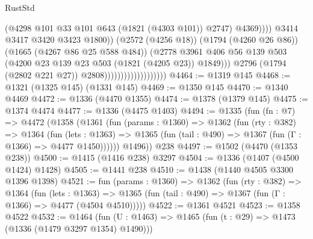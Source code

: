 \begin{lexlean}{RustStd}
\begin{coremodule}
{\begin{coremodule}
{{{{{{{{{{{{{{                                                        (@4298
                                                          @101
                                                          @33
                                                          @101
                                                          @643
                                                          (@1821 (@4303 @101))
                                                          @2747)
                                                        @4369))))
                                                @3414
                                                @3417
                                                @3420
                                                @3423
                                                @1800))
                                            (@2572 (@4256 @18))
                                            (@1794 (@4260 @26 @86))
                                            (@1665 (@4267 @86 @25 @588 @484))
                                            (@2778
                                              @3961
                                              @406
                                              @56
                                              @139
                                              @503
                                              (@4200 @23 @139 @23 @503 (@1821 (@4205 @23)) @1849)))
                                          @2796
                                          (@1794 (@2802 @221 @27))
                                          @2808)))))))))))))))))))
@4464 := @1319 @145
@4468 := @1321 (@1325 @145) (@1331 @145)
@4469 := @1350 @145
@4470 := @1340 @4469
@4472 := @1336 (@4470 @1355)
@4474 := @1378 (@1379 @145)
@4475 := @1374 @4474
@4477 := @1336 (@4475 @1403)
@4494 := @1335
    (fun (fn : @7) =>
    @4472
      (@1358
        (@1361
          (fun (params : @1360) =>
          @1362
            (fun (rty : @382) =>
            @1364
              (fun (lets : @1363) =>
              @1365 (fun (tail : @490) => @1367 (fun (Γ : @1366) => @4477 @1450))))))
        @1496))
    @238
@4497 := @1502 (@4470 (@1353 @238))
@4500 := @1415 (@1416 @238) @3297
@4504 := @1336 (@1407 (@4500 @1424) @1428)
@4505 := @1441 @238
@4510 := @1438 (@1440 @4505 @3300 @1396 @1398)
@4521 := fun (params : @1360) =>
  @1362
    (fun (rty : @382) =>
    @1364
      (fun (lets : @1363) =>
      @1365 (fun (tail : @490) => @1367 (fun (Γ : @1366) => @4477 (@4504 @4510)))))
@4522 := @1361 @4521
@4523 := @1358 @4522
@4532 := @1464 (fun (U : @1463) => @1465 (fun (t : @29) => @1473 (@1336 (@1479 @3297 @1354) @1490)))
}}}}}}}}}}}}}}
\end{coremodule}}
\end{coremodule}
\end{lexlean}
